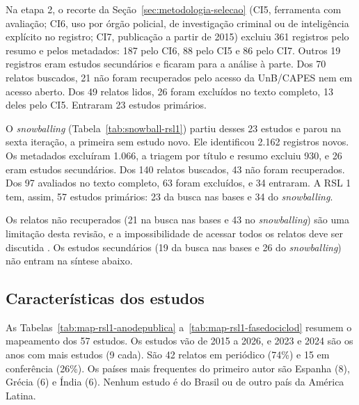 Na etapa 2, o recorte da Seção~\ref{sec:metodologia-selecao} (CI5, ferramenta
com avaliação; CI6, uso por órgão policial, de investigação criminal ou de
inteligência explícito no registro; CI7, publicação a partir de 2015) excluiu
361 registros pelo resumo e pelos metadados: 187 pelo CI6, 88 pelo CI5 e 86
pelo CI7. Outros 19 registros eram estudos secundários e ficaram para a
análise à parte. Dos 70 relatos buscados, 21 não foram recuperados pelo
acesso da UnB/CAPES nem em acesso aberto. Dos 49 relatos lidos, 26 foram
excluídos no texto completo, 13 deles pelo CI5. Entraram 23
estudos primários.

O \textit{snowballing} (Tabela~\ref{tab:snowball-rsl1}) partiu desses 23
estudos e parou na sexta iteração, a primeira sem estudo novo. Ele
identificou 2.162 registros novos. Os metadados excluíram 1.066, a triagem
por título e resumo excluiu 930, e 26 eram estudos secundários. Dos 140
relatos buscados, 43 não foram recuperados. Dos 97 avaliados no texto
completo, 63 foram excluídos, e 34 entraram. A RSL 1 tem, assim, 57 estudos
primários: 23 da busca nas bases e 34 do \textit{snowballing}.



Os relatos não recuperados (21 na busca nas bases e 43 no
\textit{snowballing}) são uma limitação desta revisão, e a impossibilidade de
acessar todos os relatos deve ser discutida \cite[item 23c]{page2021ee}. Os
estudos secundários (19 da busca nas bases e 26 do \textit{snowballing}) não
entram na síntese abaixo.

\subsection{Características dos estudos}
\label{sec:rsl1-caracteristicas}

As Tabelas~\ref{tab:map-rsl1-anodepublica} a~\ref{tab:map-rsl1-fasedociclod}
resumem o mapeamento dos 57 estudos. Os estudos vão de 2015 a 2026, e 2023 e
2024 são os anos com mais estudos (9 cada). São 42 relatos em periódico (74\%)
e 15 em conferência (26\%). Os países mais frequentes do primeiro autor são
Espanha (8), Grécia (6) e Índia (6). Nenhum estudo é do Brasil ou de outro
país da América Latina.

